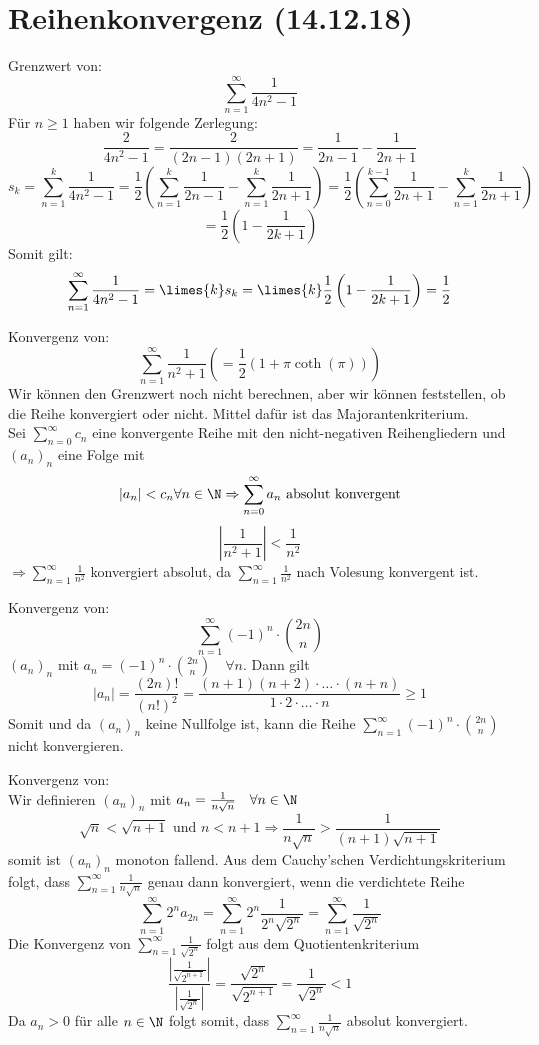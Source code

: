 \documentclass[12pt,a4paper,titlepage,draft]{article}
\begin{document}
	\section{Reihenkonvergenz (14.12.18)}
	\begin{bsp}
		Grenzwert von:
		\[\sum_{n=1}^{\infty} \frac{1}{4n^2 - 1}\]
		Für \(n \geq 1\) haben wir folgende Zerlegung:
		\[\frac{2}{4n^2 - 1} = \frac{2}{(2n - 1)(2n + 1)} = \frac{1}{2n-1} - \frac{1}{2n+1}\]
		\[s_k = \sum_{n=1}^{k} \frac{1}{4n^2-1} = \frac{1}{2}\left(\sum_{n=1}^{k} \frac{1}{2n-1} - \sum_{n=1}^{k} \frac{1}{2n+1} \right) = \frac{1}{2}\left(\sum_{n=0}^{k-1} \frac{1}{2n+1} - \sum_{n=1}^{k} \frac{1}{2n+1} \right)\]
		\[= \frac{1}{2}\left(1 - \frac{1}{2k+1}\right)\]
		Somit gilt:
		\[\sum_{n=1}^{\infty} \frac{1}{4n^2 - 1} = \limes{k} s_k = \limes{k} \frac{1}{2}\left(1 - \frac{1}{2k+1}\right) = \frac{1}{2} \]
	\end{bsp}
	\begin{bsp}
		Konvergenz von:
		\[\sum_{n=1}^{\infty} \frac{1}{n^2+1} \left(= \frac{1}{2}(1 + \pi \coth(\pi)) \right)\]
		Wir können den Grenzwert noch nicht berechnen, aber wir können feststellen, ob die Reihe konvergiert oder nicht. Mittel dafür ist das Majorantenkriterium.\\
		Sei \(\sum_{n=0}^{\infty}c_n \) eine konvergente Reihe mit den nicht-negativen Reihengliedern und \((a_n)_n\) eine Folge mit
		\[|a_n| < c_n \forall n \in \N \Rightarrow \sum_{n=0}^{\infty} a_n \text{ absolut konvergent}\]
		\[\left|\frac{1}{n^2+1}\right| < \frac{1}{n^2}\]
		\(\Rightarrow \sum_{n=1}^{\infty} \frac{1}{n^2}\) konvergiert absolut, da \(\sum_{n=1}^{\infty} \frac{1}{n^2}\) nach Volesung konvergent ist.
	\end{bsp}
	\begin{bsp}
		Konvergenz von:\[\sum_{n=1}^{\infty} (-1)^n \cdot \binom{2n}{n}\]
		\((a_n)_n\) mit \(a_n = (-1)^n \cdot \binom{2n}{n} \quad \forall n\). Dann gilt
		\[|a_n| = \frac{(2n)!}{(n!)^2} = \frac{(n+1)(n+2) \cdot \hdots \cdot (n+n)}{1 \cdot 2 \cdot \hdots \cdot n} \geq 1\]
		Somit und da \((a_n)_n\) keine Nullfolge ist, kann die Reihe \(\sum_{n=1}^{\infty} (-1)^n \cdot \binom{2n}{n}\) nicht konvergieren.
	\end{bsp}
	\begin{bsp}
		Konvergenz von:\\
		Wir definieren \((a_n)_n\) mit \(a_n = \frac{1}{n\sqrt{n}} \quad \forall n \in \N\)\\
		\[\sqrt{n} < \sqrt{n+1} \text{ und } n < n+1 \Rightarrow \frac{1}{n\sqrt{n}} > \frac{1}{(n+1)\sqrt{n+1}}\]
		somit ist \((a_n)_n\) monoton fallend. Aus dem Cauchy'schen Verdichtungskriterium folgt, dass \(\sum_{n=1}^{\infty} \frac{1}{n\sqrt{n}}\) genau dann konvergiert, wenn die verdichtete Reihe
		\[\sum_{n=1}^{\infty} 2^n a_{2n} = \sum_{n=1}^{\infty} 2^n \frac{1}{2^n\sqrt{2^n}} = \sum_{n=1}^{\infty} \frac{1}{\sqrt{2^n}}\]
		Die Konvergenz von \(\sum_{n=1}^{\infty} \frac{1}{\sqrt{2^n}}\) folgt aus dem Quotientenkriterium
		\[\frac{\left|\frac{1}{\sqrt{2^{n+1}}}\right|}{\left|\frac{1}{\sqrt{2^n}}\right|} = \frac{\sqrt{2^n}}{\sqrt{2^{n+1}}} = \frac{1}{\sqrt{2^n}} < 1\]
		Da \(a_n > 0\) für alle \(n \in \N\) folgt somit, dass \(\sum_{n=1}^{\infty} \frac{1}{n\sqrt{n}}\) absolut konvergiert.
	\end{bsp}
\end{document}
